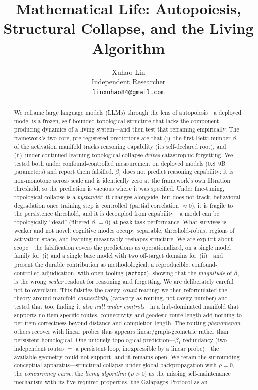 \documentclass{article}
\title{Mathematical Life: Autopoiesis, Structural Collapse, and the Living Algorithm}
\author{
  Xuhao Lin \\
  Independent Researcher \\
  \texttt{linxuhao84@gmail.com}
}
\begin{document}
\maketitle

\begin{abstract}
We reframe large language models (LLMs) through the lens of autopoiesis---a deployed model is a frozen, self-bounded topological structure that lacks the component-producing dynamics of a living system---and then test that reframing empirically. The framework's two core, pre-registered predictions are that (i)~the first Betti number $\beta_1$ of the activation manifold tracks reasoning capability (its self-declared root), and (ii)~under continued learning topological collapse \emph{drives} catastrophic forgetting. We tested both under confound-controlled measurement on deployed models ($0.8$--$9$B parameters) and report them falsified. $\beta_1$ does not predict reasoning capability: it is non-monotone across scale and is identically zero at the framework's own filtration threshold, so the prediction is vacuous where it was specified. Under fine-tuning, topological collapse is a \emph{bystander}: it changes alongside, but does not track, behavioral degradation once training step is controlled (partial correlation $\approx 0$), it is fragile to the persistence threshold, and it is decoupled from capability---a model can be topologically ``dead'' (filtered $\beta_1 = 0$) at peak task performance. What survives is weaker and not novel: cognitive modes occupy separable, threshold-robust regions of activation space, and learning measurably reshapes structure. We are explicit about scope---the falsification covers the predictions as operationalized, on a single model family for~(i) and a single base model with two off-target domains for~(ii)---and present the durable contribution as methodological: a reproducible, confound-controlled adjudication, with open tooling (\texttt{actopo}), showing that the \emph{magnitude} of $\beta_1$ is the wrong \emph{scalar} readout for reasoning and forgetting. We are deliberately careful not to overclaim. This falsifies the cavity-\emph{count} reading; we then reformulated the theory around manifold \emph{connectivity} (capacity as routing, not cavity number) and tested that too, finding it \emph{also null under controls}---in a hub-dominated manifold that supports no item-specific routes, connectivity and geodesic route length add nothing to per-item correctness beyond distance and completion length. The routing \emph{phenomenon} others recover with linear probes thus appears linear/graph-geometric rather than persistent-homological. One uniquely-topological prediction---$\beta_1$ redundancy (two independent routes $=$ a persistent loop, inexpressible by a linear probe)---the available geometry could not support, and it remains open. We retain the surrounding conceptual apparatus---structural collapse under global backpropagation with $\rho = 0$, the \emph{concurrency curse}, the \emph{living algorithm} ($\rho > 0$) as the missing self-maintenance mechanism with its five required properties, the Gal\'apagos Protocol as an 
\end{abstract}
\end{document}
